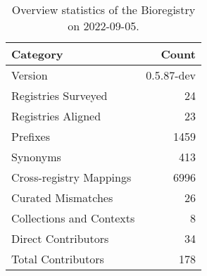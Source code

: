 \begin{table}
\centering
\caption{Overview statistics of the Bioregistry on 2022-09-05.}
\label{tab:bioregistry-summary}
\begin{tabular}{lr}
\toprule
                Category &      Count \\
\midrule
                 Version & 0.5.87-dev \\
     Registries Surveyed &         24 \\
      Registries Aligned &         23 \\
                Prefixes &       1459 \\
                Synonyms &        413 \\
 Cross-registry Mappings &       6996 \\
      Curated Mismatches &         26 \\
Collections and Contexts &          8 \\
     Direct Contributors &         34 \\
      Total Contributors &        178 \\
\bottomrule
\end{tabular}
\end{table}
